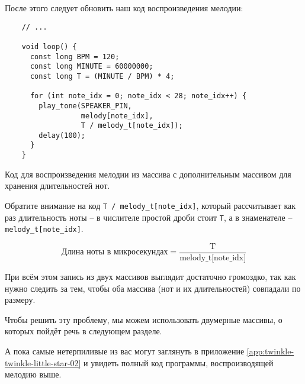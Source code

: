 \documentclass[../sparc.tex]{subfiles}
\begin{document}
После этого следует обновить наш код воспроизведения мелодии:

\begin{listing}[ht]
  \begin{verbatim}
    // ...

    void loop() {
      const long BPM = 120;
      const long MINUTE = 60000000;
      const long T = (MINUTE / BPM) * 4;

      for (int note_idx = 0; note_idx < 28; note_idx++) {
        play_tone(SPEAKER_PIN,
                  melody[note_idx],
                  T / melody_t[note_idx]);
        delay(100);
      }
    }
  \end{verbatim}
  \label{listing:music-array-example-5}
  \caption{Код для воспроизведения мелодии из массива с дополнительным массивом
    для хранения длительностей нот.}
\end{listing}

Обратите внимание на код \texttt{T / melody\_t[note\_idx]}, который рассчитывает
как раз длительность ноты -- в числителе простой дроби стоит \texttt{T}, а в
знаменателе -- \texttt{melody\_t[note\_idx]}.

\begin{equation}
  \mbox{Длина ноты в микросекундах} = \frac{\mbox{T}}{\mbox{melody\_t[note\_idx]}}
\end{equation}

При всём этом запись из двух массивов выглядит достаточно громоздко, так как
нужно следить за тем, чтобы оба массива (нот и их длительностей) совпадали по
размеру.

Чтобы решить эту проблему, мы можем использовать двумерные массивы, о которых
пойдёт речь в следующем разделе.

А пока самые нетерпиливые из вас могут заглянуть в приложение
\ref{app:twinkle-twinkle-little-star-02} и увидеть полный код программы,
воспроизводящей мелодию выше.
\end{document}
